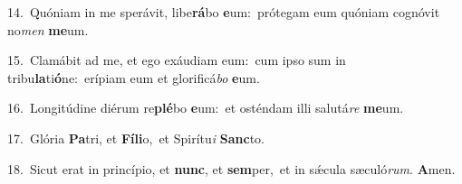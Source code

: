 {\numbfont\textcolor{\numbcolor}{14.}}~Quóniam in me sperávit, libe\-\textbf{rá}\-bo \textbf{e}\-um:~\star prótegam eum quóniam cognóvit no\textit{men} \textbf{me}\-um.\par
{\numbfont\textcolor{\numbcolor}{15.}}~Clamábit ad me, et ego exáudiam eum:~\dagger cum ipso sum in tribu\-\textbf{la}\-ti\-\textbf{ó}\-ne:~\star erípiam eum et glorificá\textit{bo} \textbf{e}\-um.\par
{\numbfont\textcolor{\numbcolor}{16.}}~Longitúdine diérum re\-\textbf{plé}\-bo \textbf{e}\-um:~\star et osténdam illi salutá\textit{re} \textbf{me}\-um.\par
{\numbfont\textcolor{\numbcolor}{17.}}~Glória \textbf{Pa}\-tri, et \textbf{Fí}\-\textbf{li}o,~\star et Spirítu\textit{i} \textbf{Sanc}\-to.\par
{\numbfont\textcolor{\numbcolor}{18.}}~Sicut erat in princípio, et \textbf{nunc}\-, et \textbf{sem}\-per,~\star et in sǽcula sæculó\-\textit{rum}\-. \textbf{A}\-men.\par
